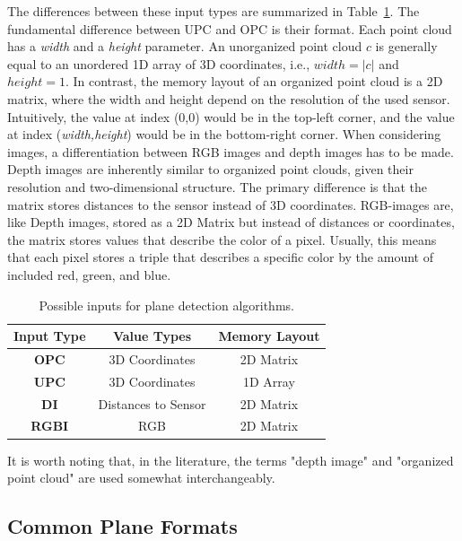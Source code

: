 \documentclass[main.tex]{subfiles}
\begin{document}
The differences between these input types are summarized in Table~\ref{tab:inputs}.
The fundamental difference between UPC and OPC is their format. Each point cloud has a \textit{width} and a \textit{height} parameter.
An unorganized point cloud $c$ is generally equal to an unordered 1D array of 3D coordinates, i.e., $width = |c|$ and $height=1$.
In contrast, the memory layout of an organized point cloud is a 2D matrix, where the width and height depend on the resolution of the used sensor.
Intuitively, the value at index (0,0) would be in the top-left corner, and the value at index (\textit{width,height}) would be in the bottom-right corner.
When considering images, a differentiation between RGB images and depth images has to be made.
Depth images are inherently similar to organized point clouds, given their resolution and two-dimensional structure.
The primary difference is that the matrix stores distances to the sensor instead of 3D coordinates.
RGB-images are, like Depth images, stored as a 2D Matrix but instead of distances or coordinates, the matrix stores
values that describe the color of a pixel. Usually, this means that each pixel stores a triple that describes a specific
color by the amount of included red, green, and blue.
\begin{table}[H]
    \centering
    \begin{tabular}{c|c|c}
        \textbf{Input Type} & \textbf{Value Types} & \textbf{Memory Layout} \\ \hline
        \textbf{OPC}        & 3D Coordinates       & 2D Matrix              \\
        \textbf{UPC}        & 3D Coordinates       & 1D Array               \\
        \textbf{DI}         & Distances to Sensor  & 2D Matrix              \\
        \textbf{RGBI}       & RGB                  & 2D Matrix
    \end{tabular}
    \caption{Possible inputs for plane detection algorithms.}
    \label{tab:inputs}
\end{table}
It is worth noting that, in the literature, the terms "depth image" and "organized point cloud" are used somewhat 
interchangeably.

\subsection{Common Plane Formats}
\end{document}
